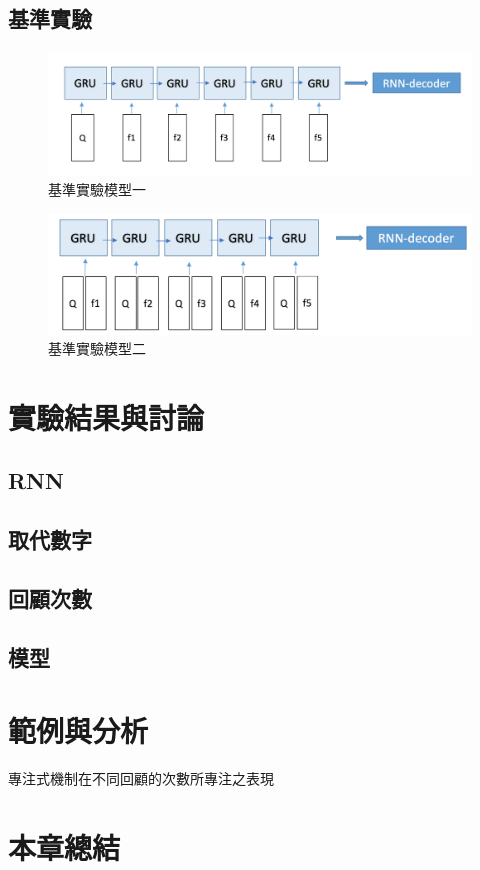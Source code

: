 \subsection{基準實驗}
\begin{figure}[h]
    \centering
    \includegraphics[scale=0.54]{images/chap3_baseline1.png}
    \caption{基準實驗模型一}\label{fig:baseline1}
\end{figure}
\begin{figure}[h]
    \centering
    \includegraphics[scale=0.54]{images/chap3_baseline2.png}
    \caption{基準實驗模型二}\label{fig:baseline2}
\end{figure}

\section{實驗結果與討論}
\subsection{RNN}
\subsection{取代數字}
\subsection{回顧次數}
\subsection{模型}
\section{範例與分析}
專注式機制在不同回顧的次數所專注之表現
\section{本章總結}
